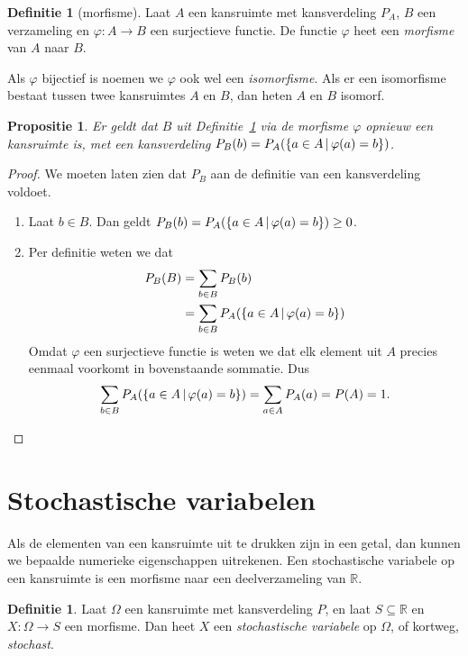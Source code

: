 \documentclass[a4paper]{book}
\newtheorem{proposition}[theorem]{Propositie}
\theoremstyle{definition}
\newtheorem{definition}[theorem]{Definitie}
\newcommand{\reals}{\mathbb{R}}
\begin{document}
\begin{definition}[morfisme]\label{morfisme}
    Laat $A$ een kansruimte met kansverdeling $P_A$, $B$ een verzameling en $\varphi : A \to B$ een surjectieve functie.
    De functie $\varphi$ heet een \emph{morfisme} van $A$ naar $B$.

    Als $\varphi$ bijectief is noemen we $\varphi$ ook wel een \emph{isomorfisme}.
    Als er een isomorfisme bestaat tussen twee kansruimtes $A$ en $B$, dan heten $A$ en $B$ isomorf.
\end{definition}

\begin{proposition}\label{morfisme_codomein_kansruimte}
    Er geldt dat $B$ uit Definitie~\ref{morfisme} via de morfisme $\varphi$ opnieuw een kansruimte is,
    met een kansverdeling $P_B(b) = P_A(\set{a \in A}{\varphi(a) = b})$.
\end{proposition}
\begin{proof}
    We moeten laten zien dat $P_B$ aan de definitie van een kansverdeling voldoet.

    \begin{enumerate}[i]
        \item Laat $b \in B$. Dan geldt $P_B(b) =  P_A(\set{a \in A}{\varphi(a) = b}) \geq 0$.
        \item Per definitie weten we dat
        \begin{align*}
            P_B(B) &= \sum_{b \in B} P_B(b) \\
                   &= \sum_{b \in B} P_A(\set{a \in A}{\varphi(a) = b})
        \end{align*}
        Omdat $\varphi$ een surjectieve functie is weten we dat elk element uit $A$ precies eenmaal voorkomt in bovenstaande sommatie.
        Dus \[ \sum_{b \in B} P_A(\set{a \in A}{\varphi(a) = b}) = \sum_{a \in A} P_A(a) = P(A) = 1. \]
    \end{enumerate}
\end{proof}


\section{Stochastische variabelen}

Als de elementen van een kansruimte uit te drukken zijn in een getal, dan kunnen we bepaalde numerieke eigenschappen uitrekenen.
Een stochastische variabele op een kansruimte is een morfisme naar een deelverzameling van $\reals$.

\begin{definition}
    Laat $\Omega$ een kansruimte met kansverdeling $P$, en laat $S \subseteq \reals$ en $X : \Omega \to S$ een morfisme.
    Dan heet $X$ een \emph{stochastische variabele} op $\Omega$, of kortweg, \emph{stochast}.
\end{definition}
\end{document}
